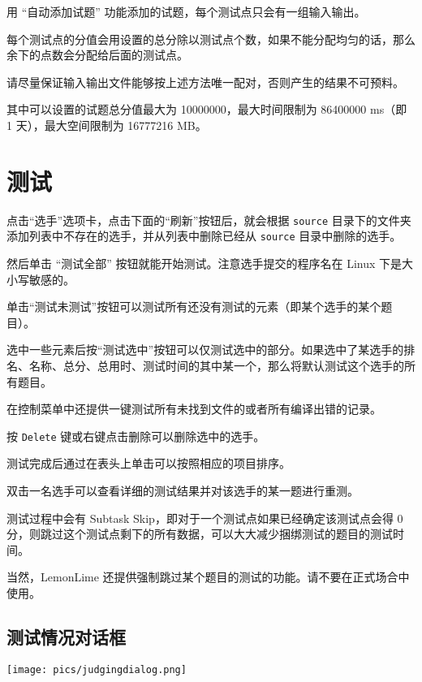 \documentclass[UTF-8]{ctexart}
\begin{document}
			用 “自动添加试题” 功能添加的试题，每个测试点只会有一组输入输出。

			每个测试点的分值会用设置的总分除以测试点个数，如果不能分配均匀的话，那么余下的点数会分配给后面的测试点。

			请尽量保证输入输出文件能够按上述方法唯一配对，否则产生的结果不可预料。

			其中可以设置的试题总分值最大为 10000000，最大时间限制为 86400000 ms（即 1 天），最大空间限制为 16777216 MB。

	\newpage

	\section{测试}

		点击“选手”选项卡，点击下面的“刷新”按钮后，就会根据 \texttt{source} 目录下的文件夹添加列表中不存在的选手，并从列表中删除已经从 \texttt{source} 目录中删除的选手。

		然后单击 “测试全部” 按钮就能开始测试。注意选手提交的程序名在 Linux 下是大小写敏感的。

		单击“测试未测试”按钮可以测试所有还没有测试的元素（即某个选手的某个题目）。

		选中一些元素后按“测试选中”按钮可以仅测试选中的部分。如果选中了某选手的排名、名称、总分、总用时、测试时间的其中某一个，那么将默认测试这个选手的所有题目。

		在控制菜单中还提供一键测试所有未找到文件的或者所有编译出错的记录。

		按 \texttt{Delete} 键或右键点击删除可以删除选中的选手。

		测试完成后通过在表头上单击可以按照相应的项目排序。

		双击一名选手可以查看详细的测试结果并对该选手的某一题进行重测。

		测试过程中会有 Subtask Skip，即对于一个测试点如果已经确定该测试点会得 0 分，则跳过这个测试点剩下的所有数据，可以大大减少捆绑测试的题目的测试时间。

		当然，LemonLime 还提供强制跳过某个题目的测试的功能。请不要在正式场合中使用。

		\subsection{测试情况对话框}

			\begin{center}
			\texttt{[image: pics/judgingdialog.png]}
			\end{center}
\end{document}
